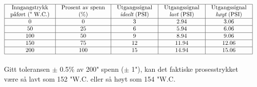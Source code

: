 
$$\vbox{\offinterlineskip
\halign{\strut
\vrule \quad\hfil # \ \hfil & 
\vrule \quad\hfil # \ \hfil & 
\vrule \quad\hfil # \ \hfil & 
\vrule \quad\hfil # \ \hfil & 
\vrule \quad\hfil # \ \hfil \vrule \cr
\noalign{\hrule}
%
Inngangstrykk & Prosent av spenn & Utgangssignal & Utgangssignal & Utgangssignal \cr
%
påført (" W.C.) & (\%) & {\it ideelt} (PSI) & {\it lavt} (PSI) & {\it høyt} (PSI) \cr
%
\noalign{\hrule}
%
0 & 0 & 3 & 2.94 & 3.06 \cr
%
\noalign{\hrule}
%
50 & 25 & 6 & 5.94 & 6.06 \cr
%
\noalign{\hrule}
%
100 & 50 & 9 & 8.94 & 9.06 \cr
%
\noalign{\hrule}
%
150 & 75 & 12 & 11.94 & 12.06 \cr
%
\noalign{\hrule}
%
200 & 100 & 15 & 14.94 & 15.06 \cr
%
\noalign{\hrule}
} %
}$$ %

Gitt toleransen $\pm$ 0.5\% av 200" spenn ($\pm$ 1"), kan det faktiske prosesstrykket være så lavt som 152 "W.C. eller så høyt som 154 "W.C.









